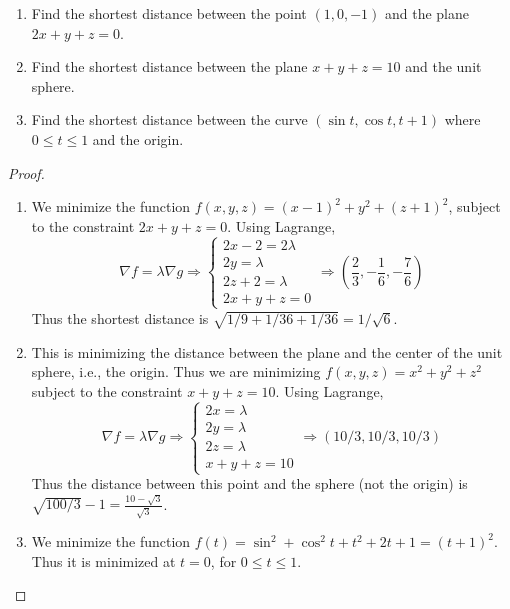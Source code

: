 \documentclass[openany]{book}
\begin{document}
\begin{prob}
    \begin{enumerate}
        \item Find the shortest distance between the point $(1,0,-1)$ and the plane $2x+y+z=0$.
        \item Find the shortest distance between the plane $x+y+z=10$ and the unit sphere. 
        \item Find the shortest distance between the curve $(\sin t, \cos t, t+1)$ where $0\leq t\leq 1$ and the origin.
    \end{enumerate}
\end{prob}
\begin{proof}
    \begin{enumerate}
        \item We minimize the function $f(x,y,z)=(x-1)^2+y^2+(z+1)^2$, subject to the constraint $2x+y+z=0$. Using Lagrange,
        \begin{equation*}
            \nabla f=\lambda\nabla g\Rightarrow\begin{cases}
                2x-2=2\lambda\\
                2y=\lambda\\
                2z+2=\lambda\\
                2x+y+z=0
            \end{cases}\Rightarrow\left(\frac{2}{3}, -\frac{1}{6},-\frac{7}{6}\right)
        \end{equation*}
        Thus the shortest distance is $\sqrt{1/9+1/36+1/36}=1/\sqrt{6}$.
        \item This is minimizing the distance between the plane and the center of the unit sphere, i.e., the origin. Thus we are minimizing $f(x,y,z)=x^2+y^2+z^2$ subject to the constraint $x+y+z=10$. Using Lagrange,
        \begin{equation*}
            \nabla f=\lambda\nabla g\Rightarrow\begin{cases}
                2x=\lambda\\
                2y=\lambda\\
                2z=\lambda\\
                x+y+z=10
            \end{cases}\Rightarrow \left(10/3, 10/3, 10/3\right)
        \end{equation*}
        Thus the distance between this point and the sphere (not the origin) is $\sqrt{100/3}-1=\frac{10-\sqrt{3}}{\sqrt{3}}$.
        \item We minimize the function $f(t)=\sin^2+\cos^2t+t^2+2t+1=(t+1)^2$. Thus it is minimized at $t=0$, for $0\leq t\leq 1$.
    \end{enumerate}
\end{proof}
\end{document}
